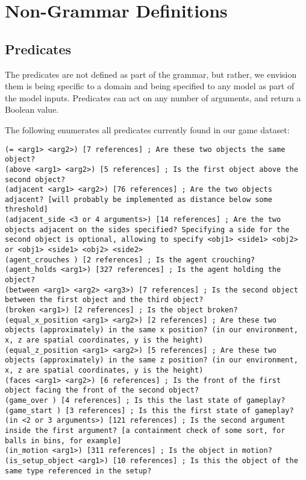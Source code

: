 \documentclass{article}
\begin{document}
\section{Non-Grammar Definitions}


\subsection{Predicates} \label{sec:predicates}
The predicates are not defined as part of the grammar, but rather, we envision them is being specific to a domain and being specified to any model as part of the model inputs.
Predicates can act on any number of arguments, and return a Boolean value.

The following enumerates all predicates currently found in our game dataset:

\begin{lstlisting}
(= <arg1> <arg2>) [7 references] ; Are these two objects the same object?
(above <arg1> <arg2>) [5 references] ; Is the first object above the second object?
(adjacent <arg1> <arg2>) [76 references] ; Are the two objects adjacent? [will probably be implemented as distance below some threshold]
(adjacent_side <3 or 4 arguments>) [14 references] ; Are the two objects adjacent on the sides specified? Specifying a side for the second object is optional, allowing to specify <obj1> <side1> <obj2> or <obj1> <side1> <obj2> <side2>
(agent_crouches ) [2 references] ; Is the agent crouching?
(agent_holds <arg1>) [327 references] ; Is the agent holding the object?
(between <arg1> <arg2> <arg3>) [7 references] ; Is the second object between the first object and the third object?
(broken <arg1>) [2 references] ; Is the object broken?
(equal_x_position <arg1> <arg2>) [2 references] ; Are these two objects (approximately) in the same x position? (in our environment, x, z are spatial coordinates, y is the height)
(equal_z_position <arg1> <arg2>) [5 references] ; Are these two objects (approximately) in the same z position? (in our environment, x, z are spatial coordinates, y is the height)
(faces <arg1> <arg2>) [6 references] ; Is the front of the first object facing the front of the second object?
(game_over ) [4 references] ; Is this the last state of gameplay?
(game_start ) [3 references] ; Is this the first state of gameplay?
(in <2 or 3 arguments>) [121 references] ; Is the second argument inside the first argument? [a containment check of some sort, for balls in bins, for example]
(in_motion <arg1>) [311 references] ; Is the object in motion?
(is_setup_object <arg1>) [10 references] ; Is this the object of the same type referenced in the setup?

\end{lstlisting}
\end{document}
